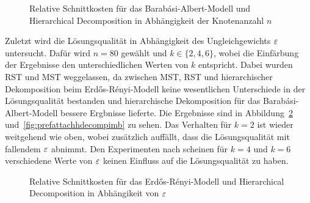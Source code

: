 \begin{figure}[H]
    \centering
    
    \caption{Relative Schnittkosten für das Barabási-Albert-Modell und Hierarchical Decomposition in Abhängigkeit der Knotenanzahl $n$\label{fig:prefattachhdecompnode}}
\end{figure}


%    
%
%    

Zuletzt wird die Lösungsqualität in Abhängigkeit des Ungleichgewichts $\varepsilon$ untersucht.
Dafür wird $n=80$ gewählt und $k \in \{2, 4, 6\}$, wobei die Einfärbung der Ergebnisse den unterschiedlichen Werten von $k$ entspricht.
Dabei wurden RST und MST weggelassen, da zwischen MST, RST und hierarchischer Dekomposition beim Erdős-Rényi-Modell keine wesentlichen Unterschiede in der Lösungsqualität bestanden und hierarchische Dekomposition für das Barabási-Albert-Modell bessere Ergbnisse lieferte.
Die Ergebnisse sind in Abbildung~\ref{fig:edgeprobhdecompimb} und~\ref{fig:prefattachhdecompimb} zu sehen.
Das Verhalten für $k=2$ ist wieder weitgehend wie oben, wobei zusätzlich auffällt, dass die Lösungsqualität mit fallendem $\varepsilon$ abnimmt.
Den Experimenten nach scheinen für $k=4$ und $k=6$ verschiedene Werte von $\varepsilon$ keinen Einfluss auf die Lösungsqualität zu haben.


\begin{figure}[H]
    \centering
    
    \caption{Relative Schnittkosten für das Erdős-Rényi-Modell und Hierarchical Decomposition in Abhängikeit von $\varepsilon$\label{fig:edgeprobhdecompimb}}
\end{figure}

%    
%
%    

